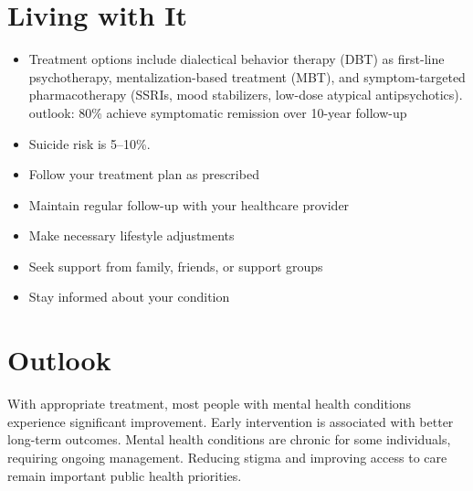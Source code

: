 \section{Living with It}
\begin{itemize}[noitemsep]
  \item Treatment options include dialectical behavior therapy (DBT) as first-line psychotherapy, mentalization-based treatment (MBT), and symptom-targeted pharmacotherapy (SSRIs, mood stabilizers, low-dose atypical antipsychotics). outlook: 80\% achieve symptomatic remission over 10-year follow-up
  \item Suicide risk is 5--10\%.
  \item Follow your treatment plan as prescribed
  \item Maintain regular follow-up with your healthcare provider
  \item Make necessary lifestyle adjustments
  \item Seek support from family, friends, or support groups
  \item Stay informed about your condition
\end{itemize}
\section{Outlook}
With appropriate treatment, most people with mental health conditions experience significant improvement. Early intervention is associated with better long-term outcomes. Mental health conditions are chronic for some individuals, requiring ongoing management. Reducing stigma and improving access to care remain important public health priorities.
